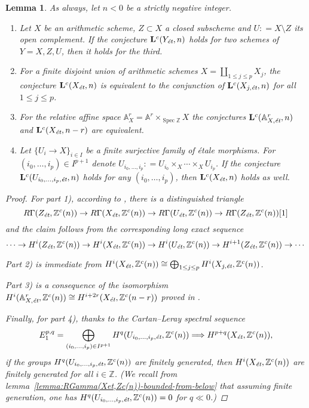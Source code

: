 \documentclass{article}
\DeclareMathOperator{\Spec}{Spec}
\newcommand{\ZZ}{\mathbb{Z}}
\renewcommand{\AA}{\mathbb{A}}
\newcommand{\et}{\text{\it ét}}
\newcommand{\dfn}{\mathrel{\mathop:}=}
\newtheorem{lemma}[theorem]{Lemma}
\theoremstyle{definition}
\numberwithin{equation}{section}
\begin{document}
\begin{lemma}
  \label{lemma:Lc(Xet)-operations}
  As always, let $n < 0$ be a strictly negative integer.

  \begin{enumerate}
  \item[1)] Let $X$ be an arithmetic scheme, $Z \subset X$ a closed subscheme
    and $U \dfn X\setminus Z$ its open complement. If the conjecture
    $\mathbf{L}^c (Y_\et,n)$ holds for two schemes of $Y = X,Z,U$, then it holds
    for the third.

  \item[2)] For a finite disjoint union of arithmetic schemes
    $X = \coprod_{1 \le j \le p} X_j$, the conjecture $\mathbf{L}^c (X_\et,n)$
    is equivalent to the conjunction of $\mathbf{L}^c (X_{j,\et},n)$ for all
    $1 \le j \le p$.

  \item[3)] For the relative affine space $\AA^r_X = \AA^r \times_{\Spec \ZZ} X$
    the conjectures $\mathbf{L}^c (\AA^r_{X,\et},n)$ and
    $\mathbf{L}^c (X_\et,n-r)$ are equivalent.

  \item[4)] Let $\{ U_i \to X \}_{i \in I}$ be a finite surjective family of
    étale morphisms. For $(i_0,\ldots,i_p) \in I^{p+1}$ denote
    $U_{i_0,\ldots,i_p} \dfn U_{i_0} \times_X \cdots \times_X U_{i_p}$.
    If the conjecture $\mathbf{L}^c (U_{i_0,\ldots,i_p, \et},n)$ holds for any
    $(i_0,\ldots,i_p)$, then $\mathbf{L}^c (X_\et,n)$ holds as well.
  \end{enumerate}

  \begin{proof}
    For part 1), according to \cite[Corollary~7.2]{Geisser-2010}, there is a
    distinguished triangle
    \[ R\Gamma (Z_\et, \ZZ^c (n)) \to
       R\Gamma (X_\et, \ZZ^c (n)) \to
       R\Gamma (U_\et, \ZZ^c (n)) \to
       R\Gamma (Z_\et, \ZZ^c (n)) [1] \]
    and the claim follows from the corresponding long exact sequence
    \[ \cdots \to H^i (Z_\et, \ZZ^c (n)) \to
       H^i (X_\et, \ZZ^c (n)) \to
       H^i (U_\et, \ZZ^c (n)) \to
       H^{i+1} (Z_\et, \ZZ^c (n)) \to \cdots \]

    Part 2) is immediate from
    $H^i (X_\et, \ZZ^c (n)) \cong \bigoplus_{1 \le j \le p} H^i (X_{j,\et}, \ZZ^c (n))$.

    Part 3) is a consequence of the isomorphism
    $H^i (\AA^r_{X,\et}, \ZZ^c (n)) \cong H^{i+2r} (X_\et, \ZZ^c (n-r))$
    proved in \cite[Lemma~5.11]{Morin-2014}.

    Finally, for part 4), thanks to the Cartan--Leray spectral sequence
    $$E_1^{p,q} = \bigoplus_{(i_0,\ldots,i_p) \in I^{p+1}} H^q (U_{i_0,\ldots,i_p, \et}, \ZZ^c (n)) \Longrightarrow H^{p+q} (X_\et, \ZZ^c (n)),$$
    if the groups $H^q (U_{i_0,\ldots,i_p, \et}, \ZZ^c (n))$ are finitely
    generated, then $H^i (X_\et, \ZZ^c (n))$ are finitely generated for all
    $i\in \ZZ$. (We recall from
    lemma~\ref{lemma:RGamma(Xet,Zc(n))-bounded-from-below} that assuming finite
    generation, one has $H^q (U_{i_0,\ldots,i_p, \et}, \ZZ^c (n)) = 0$ for
    $q \ll 0$.)
  \end{proof}
\end{lemma}
\end{document}
